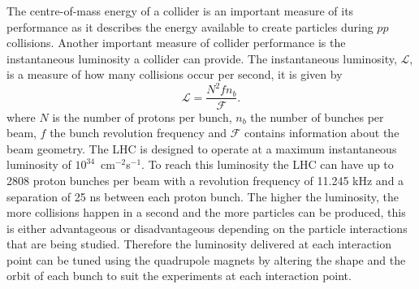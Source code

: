 The centre-of-mass energy of a collider is an important measure of its performance as it describes the energy available to create particles during $pp$ collisions. Another important measure of collider performance is the instantaneous luminosity a collider can provide. The instantaneous luminosity, $\mathcal{L}$, is a measure of how many collisions occur per second, it is given by
\begin{equation}
\mathcal{L} = \frac{N^{2} f n_{b}}{\mathcal{F}}.
\label{eq:inst_lumi}
\end{equation}
where $N$ is the number of protons per bunch, $n_{b}$ the number of bunches per beam, $f$ the bunch revolution frequency and $\mathcal{F}$ contains information about the beam geometry. The LHC is designed to operate at a maximum instantaneous luminosity of $10^{34}$~cm$^{-2}$s$^{-1}$. To reach this luminosity the LHC can have up to 2808 proton bunches per beam with a revolution frequency of 11.245 kHz and a separation of 25 ns between each proton bunch. %
The higher the luminosity, the more collisions happen in a second and the more particles can be produced, this is either advantageous or disadvantageous depending on the particle interactions that are being studied.
Therefore the luminosity delivered at each interaction point can be tuned using the quadrupole magnets by altering the shape and the orbit of each bunch to suit the experiments at each interaction point.




